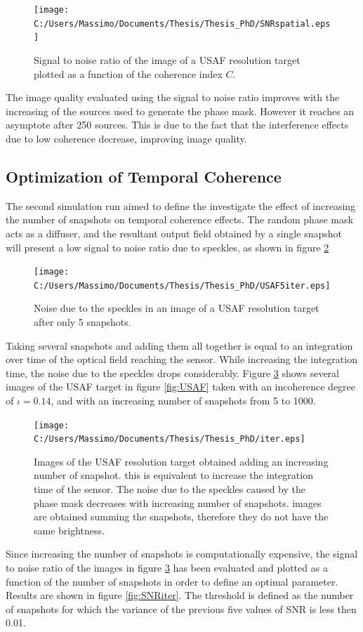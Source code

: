  \begin{figure}[H]
 	\centering
 	\texttt{[image: C:/Users/Massimo/Documents/Thesis/Thesis\_PhD/SNRspatial.eps]}
 	\caption{\label{fig:spatialsnr1}Signal to noise ratio of the image of a USAF resolution target plotted as a function of the coherence index $C$.}
 \end{figure}
 The image quality evaluated using the signal to noise ratio improves with the increasing of the sources used to generate the phase mask. However it reaches an asymptote after 250 sources. This is due to the fact that the interference effects due to low coherence decrease, improving image quality. 
 \newpage
 \subsection{Optimization of Temporal Coherence}
The second simulation run aimed to define the investigate the effect of increasing the number of snapshots on temporal coherence effects. The random phase mask acts as a diffuser, and the resultant output field obtained by a single snapshot will present a low signal to noise ratio due to speckles, as shown in figure \ref{fig:speckle}
\begin{figure}[H]
	\centering
	\texttt{[image: C:/Users/Massimo/Documents/Thesis/Thesis\_PhD/USAF5iter.eps]}
	\caption{\label{fig:speckle}Noise due to the speckles in an image of a USAF resolution target after only 5 snapshots.}
\end{figure}
Taking several snapshots and adding them all together is equal to an integration over time of the optical field reaching the sensor. While increasing the integration time, the noise due to the speckles drops considerably. Figure \ref{fig:iter} shows several images of the USAF target in figure \ref{fig:USAF} taken with an incoherence degree of $\iota=0.14$, and with an increasing number of snapshots from 5 to 1000.
 \begin{figure}[H]
 	\centering
 	\texttt{[image: C:/Users/Massimo/Documents/Thesis/Thesis\_PhD/iter.eps]}
 	\caption{\label{fig:iter}Images of the USAF resolution target obtained adding an increasing number of snapshot. this is equivalent to increase the integration time of the sensor. The noise due to the speckles caused by the phase mask decreases with increasing number of snapshots. images are obtained summing the snapshots, therefore they do not have the same brightness.}
 \end{figure}
 Since increasing the number of snapshots is computationally expensive, the signal to noise ratio of the images in figure \ref{fig:iter} has been evaluated and plotted as a function of the number of snapshots in order to define an optimal parameter. Results are shown in figure \ref{fig:SNRiter}. The threshold is defined as the number of snapshots for which the variance of the previous five values of SNR is less then 0.01.
